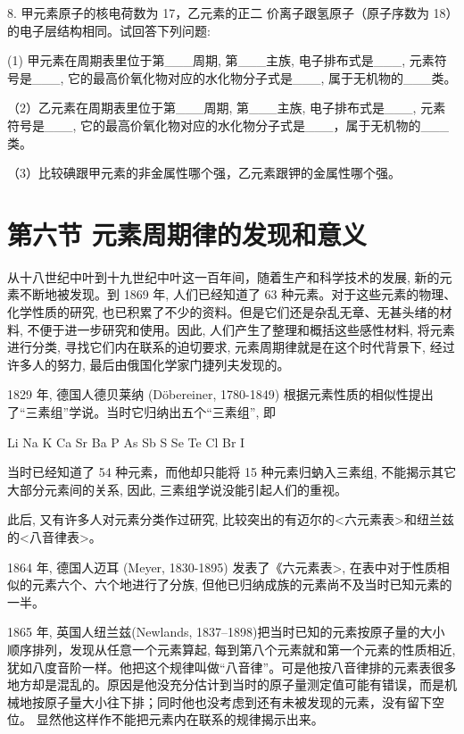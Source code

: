\documentclass[10pt]{article}
\begin{document}
8. 甲元素原子的核电荷数为 17，乙元素的正二 价离子跟氢原子（原子序数为 18）的电子层结构相同。试回答下列问题:

(1) 甲元素在周期表里位于第\_\_\_周期, 第\_\_\_主族, 电子排布式是\_\_\_, 元素符号是\_\_\_, 它的最高价氧化物对应的水化物分子式是\_\_\_, 属于无机物的\_\_\_类。

（2）乙元素在周期表里位于第\_\_\_周期, 第\_\_\_主族, 电子排布式是\_\_\_, 元素符号是\_\_\_, 它的最高价氧化物对应的水化物分子式是\_\_\_，属于无机物的\_\_\_ 类。

（3）比较碘跟甲元素的非金属性哪个强，乙元素跟钾的金属性哪个强。

\section*{第六节 元素周期律的发现和意义}

从十八世纪中叶到十九世纪中叶这一百年间，随着生产和科学技术的发展, 新的元素不断地被发现。到 1869 年, 人们已经知道了 63 种元素。对于这些元素的物理、化学性质的研究, 也已积累了不少的资料。但是它们还是杂乱无章、无甚头绪的材料, 不便于进一步研究和使用。因此, 人们产生了整理和概括这些感性材料, 将元素进行分类, 寻找它们内在联系的迫切要求, 元素周期律就是在这个时代背景下, 经过许多人的努力, 最后由俄国化学家门捷列夫发现的。

1829 年, 德国人德贝莱纳 (Döbereiner, 1780-1849) 根据元素性质的相似性提出了“三素组”学说。当时它归纳出五个“三素组”, 即

Li Na K Ca Sr Ba P As Sb S Se Te Cl Br I

当时已经知道了 54 种元素，而他却只能将 15 种元素归蚋入三素组, 不能揭示其它大部分元素间的关系, 因此, 三素组学说没能引起人们的重视。

此后, 又有许多人对元素分类作过研究, 比较突出的有迈尔的<六元素表>和纽兰兹的<八音律表>。

1864 年, 德国人迈耳 (Meyer, 1830-1895) 发表了《六元素表>, 在表中对于性质相似的元素六个、六个地进行了分族, 但他已归纳成族的元素尚不及当时已知元素的一半。

1865 年, 英国人纽兰兹(Newlands, 1837--1898)把当时已知的元素按原子量的大小顺序排列，发现从任意一个元素算起, 每到第八个元素就和第一个元素的性质相近, 犹如八度音阶一样。他把这个规律叫做“八音律”。可是他按八音律排的元素表很多地方却是混乱的。原因是他没充分估计到当时的原子量测定值可能有错误，而是机械地按原子量大小往下排；同时他也没考虑到还有未被发现的元素，没有留下空位。 显然他这样作不能把元素内在联系的规律揭示出来。
\end{document}
